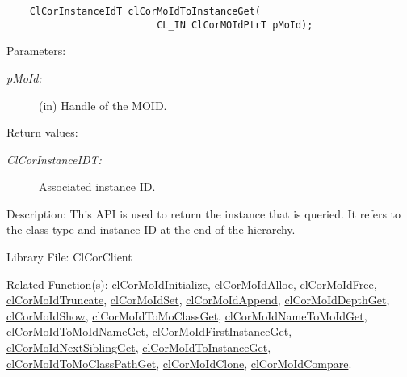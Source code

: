 \begin{flushleft}
\begin{Desc}
\footnotesize\begin{verbatim}    ClCorInstanceIdT clCorMoIdToInstanceGet(
                          CL_IN ClCorMOIdPtrT pMoId);
\end{verbatim}
\normalsize
\end{Desc}
\begin{Desc}
\item[Parameters:]
\begin{description}
\item[{\em p\-MoId:}](in) Handle of the MOID.\end{description}
\end{Desc}
\begin{Desc}
\item[Return values:]
\begin{description}
\item[{\em Cl\-Cor\-Instance\-ID\-T:}] Associated instance ID.\end{description}
\end{Desc}

\begin{Desc}
\item[Description:]This API is used to return the instance that is queried. It refers to the class type and instance ID at the end of the 
hierarchy.\end{Desc}
\begin{Desc}
\item[Library File:]Cl\-Cor\-Client\end{Desc}
\begin{Desc}
\item[Related Function(s):]\hyperlink{pagecor100}{cl\-Cor\-MoId\-Initialize}, \hyperlink{pagecor113}{cl\-Cor\-MoId\-Alloc}, 
\hyperlink{pagecor114}{cl\-Cor\-MoId\-Free},
\hyperlink{pagecor115}{cl\-Cor\-MoId\-Truncate}, 
\hyperlink{pagecor116}{cl\-Cor\-MoId\-Set}, 
\hyperlink{pagecor117}{cl\-Cor\-MoId\-Append}, 
\hyperlink{pagecor118}{cl\-Cor\-MoId\-Depth\-Get}, 
\hyperlink{pagecor119}{cl\-Cor\-MoId\-Show}, 
\hyperlink{pagecor120}{cl\-Cor\-MoId\-To\-Mo\-Class\-Get}, 
\hyperlink{pagecor121}{cl\-Cor\-MoId\-Name\-To\-MoId\-Get}, 
\hyperlink{pagecor122}{cl\-Cor\-MoId\-To\-MoId\-Name\-Get}, 
\hyperlink{pagecor123}{cl\-Cor\-MoId\-First\-Instance\-Get},
\hyperlink{pagecor124}{cl\-Cor\-MoId\-Next\-Sibling\-Get}, 
\hyperlink{pagecor125}{cl\-Cor\-MoId\-To\-Instance\-Get}, 
\hyperlink{pagecor126}{cl\-Cor\-MoId\-To\-Mo\-Class\-Path\-Get}, 
\hyperlink{pagecor127}{cl\-Cor\-MoId\-Clone}, 
\hyperlink{pagecor128}{cl\-Cor\-MoId\-Compare}.\end{Desc}
\newpage



\end{flushleft}
